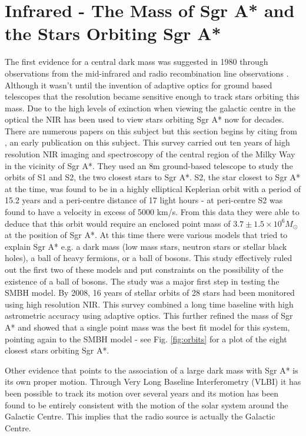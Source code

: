 \documentclass[a4paper,12pt]{article}
\begin{document}
\section{Infrared - The Mass of Sgr A* and the Stars Orbiting Sgr A*}
The first evidence for a central dark mass was suggested in 1980 through observations from the mid-infrared and radio recombination line observations \citep{falke1}. Although it wasn't until the 
invention of adaptive optics for ground based telescopes that the resolution became sensitive enough to track stars orbiting this mass.
Due to the high levels of exinction when viewing the galactic centre in the optical the NIR has been used to view stars orbiting Sgr A* now for decades. There are numerous papers on this subject but this
section begins by citing from \citep{schodel}, an early publication on this subject. This survey carried out ten years of high resolution NIR imaging and spectroscopy of the central region of the Milky 
Way in the
vicinity of Sgr A*. They used an 8m ground-based telescope to study the orbits of S1 and S2, the two closest stars to Sgr A*. S2, the star closest to Sgr A* at the time, was found to be in a
highly elliptical Keplerian orbit with a period of 15.2 years and a peri-centre distance of 17 light hours - at peri-centre S2 was found to have a velocity in excess of 5000 km/s.
From this data they were able to deduce that this orbit would require an enclosed point mass of $3.7\pm1.5\times10^6 M_{\odot}$ at the position of Sgr A*. At this time there were various models
that tried to explain Sgr A* e.g. a dark mass (low mass stars, neutron stars or stellar black holes), a ball of heavy fermions, or a  ball of bosons. This study effectively ruled out the first two of 
these models and put constraints on the possibility of the existence of a ball of bosons. The study was a major first step in testing the SMBH model.
By 2008, 16 years  of stellar orbits of 28 stars had been monitored \citep{gillessen1} using high resolution NIR. This survey combined a long time baseline with high astrometric accuracy using adaptive
optics. This further refined the mass of Sgr A* and showed that a single point mass was the best fit model for this system, pointing again to the SMBH model - see Fig. \ref{fig:orbits} for a plot
of the eight closest stars orbiting Sgr A*.

Other evidence that points to the association of a large dark mass with Sgr A* is its own proper motion. Through Very Long Baseline Interferometry (VLBI) it has been possible to track its motion over 
several years and its motion has been found to be
entirely consistent with the motion of the solar system around the Galactic Centre. This implies that the radio source is actually the Galactic Centre.
\end{document}
